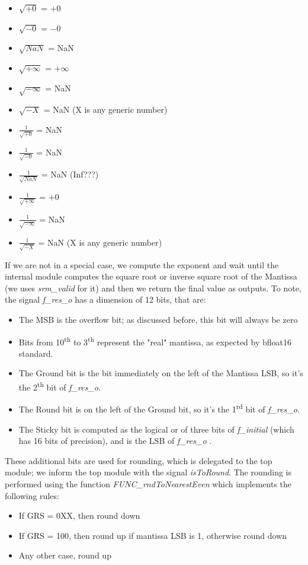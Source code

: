 \begin{itemize}
\item $\sqrt{+0}$ = $+0$ 
\item $\sqrt{-0}$ = $-0$
\item $\sqrt{NaN}$ = NaN
\item $\sqrt{+ \infty}$  =  $+\infty$
\item $\sqrt{- \infty}$ =  NaN
\item $\sqrt{- X}$ = NaN  (X is any generic number) 
\item $\frac{1}{\sqrt{+0}}$ = NaN
\item $\frac{1}{\sqrt{-0}}$ = NaN
\item $\frac{1}{\sqrt{NaN}}$ = NaN (Inf???)
\item $\frac{1}{\sqrt{+\infty}}$ = $+0$
\item $\frac{1}{\sqrt{-\infty}}$ = NaN
\item $\frac{1}{\sqrt{-X}}$ = NaN  (X is any generic number) 
\end{itemize}

If we are not in a special case, we compute the exponent and wait until the internal module computes the square root or inverse square root of the Mantissa (we uses  \emph{srm\_valid} for it) and then we return the final value as outputs. To note, the signal \emph{f\_res\_o} has a dimension of 12 bits, that are:
\begin{itemize}
\item The MSB is the overflow bit; as discussed before, this bit will always be zero
\item Bits from 10\textsuperscript{th} to 3\textsuperscript{th} represent the "real" mantissa, as expected by bfloat16 standard.
\item The Ground bit is the bit immediately on the left of the Mantissa LSB, so it's the 2\textsuperscript{th} bit of \emph{f\_res\_o}.
\item The Round bit is on the left of the Ground bit, so it's the 1\textsuperscript{rd} bit of \emph{f\_res\_o}.
\item The Sticky bit is computed as the logical or of three bits of \emph{f\_initial} (which has 16 bits of precision), and is the LSB of \emph{f\_res\_o} . 
\end{itemize}
These additional bits are used for rounding, which is delegated to the top module; we inform the top module with the signal \emph{isToRound}. The rounding is performed using the function \emph{FUNC\_rndToNearestEven} which implements the following rules:
\begin{itemize}
\item If GRS = 0XX, then round down
\item If GRS = 100, then round up if mantissa LSB is 1, otherwise round down
\item Any other case, round up
\end{itemize} 

\clearpage
